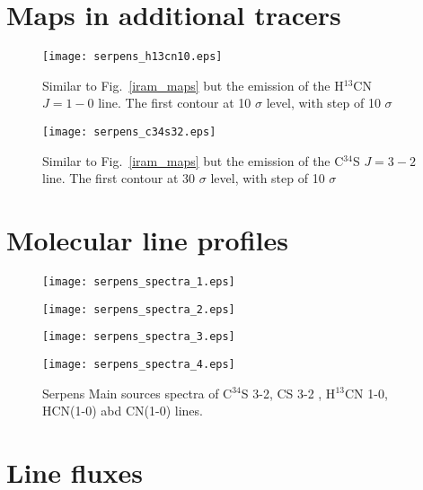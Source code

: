 \documentclass{aa}
\begin{document}
\begin{appendix}
\section{Maps in additional tracers}

\begin{figure} \texttt{[image: serpens\_h13cn10.eps]} \caption{Similar to Fig.~\ref{iram_maps}
but the emission of the H$^{13}$CN $J=1-0$ line. The first contour at 10 $\sigma$ level, with step
of 10 $\sigma$} \label{h13cn10} \end{figure}


\begin{figure} \texttt{[image: serpens\_c34s32.eps]} \caption{Similar to Fig.~\ref{iram_maps}
but the emission of the C$^{34}$S $J=3-2$ line. The first contour at 30 $\sigma$ level, with step of
10 $\sigma$} \label{c34s32} \end{figure}

\section{Molecular line profiles}

\begin{figure*} 
\centering 
\texttt{[image: serpens\_spectra\_1.eps]}
\label{Spectra2} 
\end{figure*} 

\begin{figure*} 
\centering
\texttt{[image: serpens\_spectra\_2.eps]} 
\label{Spectra3} 
\end{figure*}

\begin{figure*}
\centering 
\texttt{[image: serpens\_spectra\_3.eps]}
\label{Spectra4} 
\end{figure*} 

\begin{figure*} 
\centering
\texttt{[image: serpens\_spectra\_4.eps]} 
\caption{Serpens Main sources spectra of C$^{34}$S 3-2, CS 3-2 , H$^{13}$CN 1-0,
 HCN(1-0) abd CN(1-0) lines.} 
 \label{Spectra5}
\end{figure*}

\section{Line fluxes}


\end{appendix}
\end{document}
